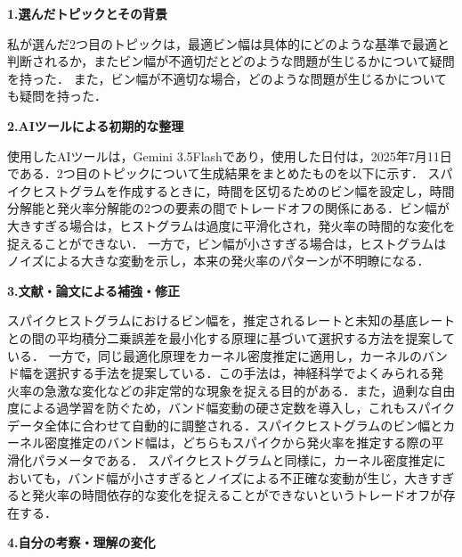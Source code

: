 \documentclass{classes/report}
\begin{document}
\newpage

\textbf{\large 1.選んだトピックとその背景}

私が選んだ2つ目のトピックは，最適ビン幅は具体的にどのような基準で最適と判断されるか，またビン幅が不適切だとどのような問題が生じるかについて疑問を持った．
また，ビン幅が不適切な場合，どのような問題が生じるかについても疑問を持った．

\textbf{\large 2.AIツールによる初期的な整理}

使用したAIツールは，Gemini 3.5Flashであり，使用した日付は，2025年7月11日である．2つ目のトピックについて生成結果をまとめたものを以下に示す．
スパイクヒストグラムを作成するときに，時間を区切るためのビン幅を設定し，時間分解能と発火率分解能の2つの要素の間でトレードオフの関係にある．ビン幅が大きすぎる場合は，ヒストグラムは過度に平滑化され，発火率の時間的な変化を捉えることができない．
一方で，ビン幅が小さすぎる場合は，ヒストグラムはノイズによる大きな変動を示し，本来の発火率のパターンが不明瞭になる．

\textbf{\large 3.文献・論文による補強・修正}

スパイクヒストグラムにおけるビン幅を，推定されるレートと未知の基底レートとの間の平均積分二乗誤差を最小化する原理に基づいて選択する方法\cite{10.1162/neco.2007.19.6.1503}を提案している．
一方で，同じ最適化原理をカーネル密度推定に適用し，カーネルのバンド幅を選択する手法\cite{Shimazaki2010}を提案している．この手法は，神経科学でよくみられる発火率の急激な変化などの非定常的な現象を捉える目的がある．また，過剰な自由度による過学習を防ぐため，バンド幅変動の硬さ定数を導入し，これもスパイクデータ全体に合わせて自動的に調整される．スパイクヒストグラムのビン幅とカーネル密度推定のバンド幅は，どちらもスパイクから発火率を推定する際の平滑化パラメータである．
スパイクヒストグラムと同様に，カーネル密度推定においても，バンド幅が小さすぎるとノイズによる不正確な変動が生じ，大きすぎると発火率の時間依存的な変化を捉えることができないというトレードオフが存在する．


\textbf{\large 4.自分の考察・理解の変化}
\end{document}
